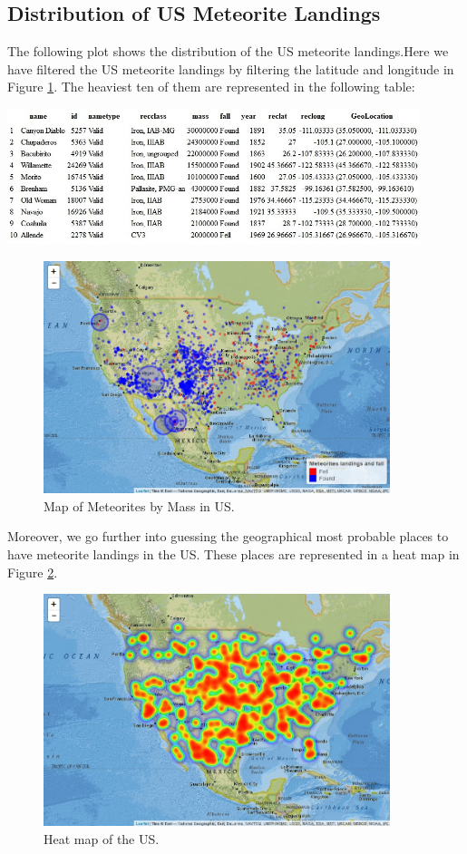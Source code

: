 \subsection{Distribution of US Meteorite Landings}
The following plot shows the distribution of the US meteorite landings.Here we have filtered the US meteorite landings by filtering the latitude and longitude in Figure \ref{fig:fig17}. The heaviest ten of them are represented in the following table:
\begin{center}
	\centering
	\includegraphics[width=0.9\textwidth]{Figures/16MeteoritesOfUS.jpeg}
\end{center}
\begin{figure}
	\centering
	\includegraphics[width=0.9\textwidth]{Figures/17MeteoritesByMassUS.jpeg}
	\caption{\label{fig:fig17} Map of Meteorites by Mass in US.}
\end{figure}

Moreover, we go further into guessing the geographical most probable places to have meteorite landings in the US. These places are represented in a heat map in Figure \ref{fig:fig18}.
\begin{figure}
	\centering
	\includegraphics[width=0.9\textwidth]{Figures/18HeatmapUS.jpeg}
	\caption{\label{fig:fig18}  Heat map of the US.}
\end{figure}

